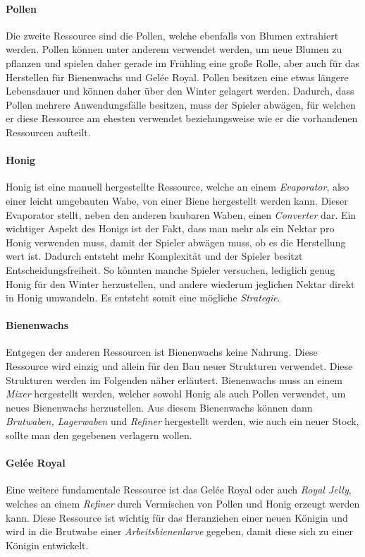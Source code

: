 \paragraph{Pollen}
Die zweite Ressource sind die Pollen, welche ebenfalls von Blumen extrahiert werden. Pollen können unter anderem verwendet werden, um neue Blumen zu pflanzen und spielen daher gerade im Frühling eine große Rolle, aber auch für das Herstellen für Bienenwachs und Gelée Royal. Pollen besitzen eine etwas längere Lebensdauer und können daher über den Winter gelagert werden. Dadurch, dass Pollen mehrere Anwendungsfälle besitzen, muss der Spieler abwägen, für welchen er diese Ressource am ehesten verwendet beziehungsweise wie er die vorhandenen Ressourcen aufteilt.

\paragraph{Honig}
Honig ist eine manuell hergestellte Ressource, welche an einem \textit{Evaporator}, also einer leicht umgebauten Wabe, von einer Biene hergestellt werden kann. Dieser Evaporator stellt, neben den anderen baubaren Waben, einen \textit{Converter} dar. Ein wichtiger Aspekt des Honigs ist der Fakt, dass man mehr als ein Nektar pro Honig verwenden muss, damit der Spieler abwägen muss, ob es die Herstellung wert ist. Dadurch entsteht mehr Komplexität und der Spieler besitzt Entscheidungsfreiheit. So könnten manche Spieler versuchen, lediglich genug Honig für den Winter herzustellen, und andere wiederum jeglichen Nektar direkt in Honig umwandeln. Es entsteht somit eine mögliche \textit{Strategie}.

\paragraph{Bienenwachs}
Entgegen der anderen Ressourcen ist Bienenwachs keine Nahrung. Diese Ressource wird einzig und allein für den Bau neuer Strukturen verwendet. Diese Strukturen werden im Folgenden näher erläutert. Bienenwachs muss an einem \textit{Mixer} hergestellt werden, welcher sowohl Honig als auch Pollen verwendet, um neues Bienenwachs herzustellen. Aus diesem Bienenwachs können dann \textit{Brutwaben, Lagerwaben} und \textit{Refiner} hergestellt werden, wie auch ein neuer Stock, sollte man den gegebenen verlagern wollen.

\paragraph{Gelée Royal}
Eine weitere fundamentale Ressource ist das Gelée Royal oder auch \textit{Royal Jelly}, welches an einem \textit{Refiner} durch Vermischen von Pollen und Honig erzeugt werden kann. Diese Ressource ist wichtig für das Heranziehen einer neuen Königin und wird in die Brutwabe einer \textit{Arbeitsbienenlarve} gegeben, damit diese sich zu einer Königin entwickelt.

